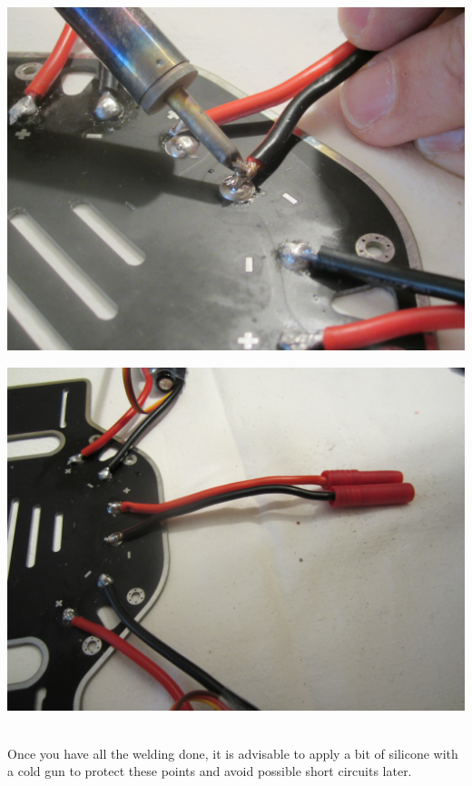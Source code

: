 \documentclass[12pt, a4paper,twoside]{tesi_upf}
\begin{document}
\begin{minipage}{0.5\textwidth}
  \centering
  \includegraphics[width=0.8\linewidth]{Images/Mounting/IMG_0392.jpg}
  \label{fig:app1}
\end{minipage}%
\begin{minipage}{0.5\textwidth}
  \centering
  \includegraphics[width=0.8\linewidth]{Images/Mounting/IMG_0394.jpg}
  \label{fig:app2}
\end{minipage}
\\[12pt]

Once you have all the welding done, it is advisable to apply a bit of silicone with a cold gun to protect these points and avoid possible short circuits later.
\end{document}
